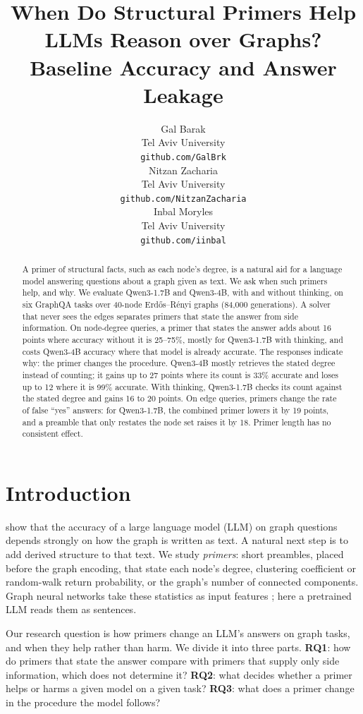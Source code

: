 \documentclass[11pt]{article}
\title{When Do Structural Primers Help LLMs Reason over Graphs?\\
Baseline Accuracy and Answer Leakage}
\author{
  Gal Barak \\
  Tel Aviv University \\
  \footnotesize\texttt{github.com/GalBrk} \\\And
  Nitzan Zacharia \\
  Tel Aviv University \\
  \footnotesize\texttt{github.com/NitzanZacharia} \\\And
  Inbal Moryles \\
  Tel Aviv University \\
  \footnotesize\texttt{github.com/iinbal} \\
}
\begin{document}
\maketitle

\begin{abstract}
A primer of structural facts, such as each node's degree, is a natural aid
for a language model answering questions about a graph given as text. We ask
when such primers help, and why. We evaluate Qwen3-1.7B and Qwen3-4B, with and
without thinking, on six GraphQA tasks over 40-node Erd\H{o}s--R\'enyi graphs
(84,000 generations). A solver that never sees the edges separates primers
that state the answer from side information. On node-degree queries, a primer
that states the answer adds about 16 points where accuracy without it is
25--75\%, mostly for Qwen3-1.7B with thinking, and costs Qwen3-4B accuracy
where that model is already accurate. The responses indicate why: the primer
changes the procedure. Qwen3-4B mostly retrieves the stated degree instead of counting; it
gains up to 27 points where its count is 33\% accurate and loses up to 12
where it is 99\% accurate. With thinking, Qwen3-1.7B checks its count
against the stated degree and gains 16 to 20 points. On edge queries, primers
change the rate of false ``yes'' answers: for Qwen3-1.7B, the combined primer
lowers it by 19 points, and a preamble that only restates the node set raises
it by 18. Primer length has no consistent effect.
\end{abstract}

\section{Introduction}
\label{sec:introduction}

\citet{fatemi2023talklikeagraph} show that the accuracy of a large language
model (LLM) on graph questions depends strongly on how the graph is written as
text. A natural next step is to add derived structure to that text. We study
\emph{primers}: short preambles, placed before the graph encoding, that state
each node's degree, clustering coefficient or random-walk return probability,
or the graph's number of connected components. Graph neural networks take
these statistics as input features \citep{dwivedi2022graph,rampasek2022recipe};
here a pretrained LLM reads them as sentences.

Our research question is how primers change an LLM's answers on graph tasks,
and when they help rather than harm. We divide it into three parts.
\textbf{RQ1}: how do primers that state the answer compare with primers that
supply only side information, which does not determine it? \textbf{RQ2}: what
decides whether a primer helps or harms a given model on a given task?
\textbf{RQ3}: what does a primer change in the procedure the model follows?
\end{document}
